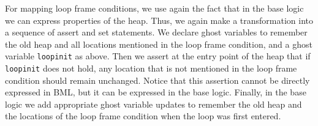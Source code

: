 For mapping loop frame conditions, we use again the fact that in the
\mobius base logic we can express properties of the heap. Thus,
we again make a transformation into a sequence of assert and set
statements. We declare ghost variables to remember the old heap and
all locations mentioned in the loop frame condition, and a ghost
variable \texttt{loop\unsc init} as above. Then we assert at the entry
point of the heap that if \texttt{loop\unsc init} does not hold, any
location that is not mentioned in the loop frame condition should
remain unchanged. Notice that this assertion cannot be directly
expressed in BML, but it can be expressed in the \mobius base
logic. Finally, in the \mobius base logic we add appropriate ghost
variable updates to remember the old heap and the locations of the
loop frame condition when the loop was first entered.










